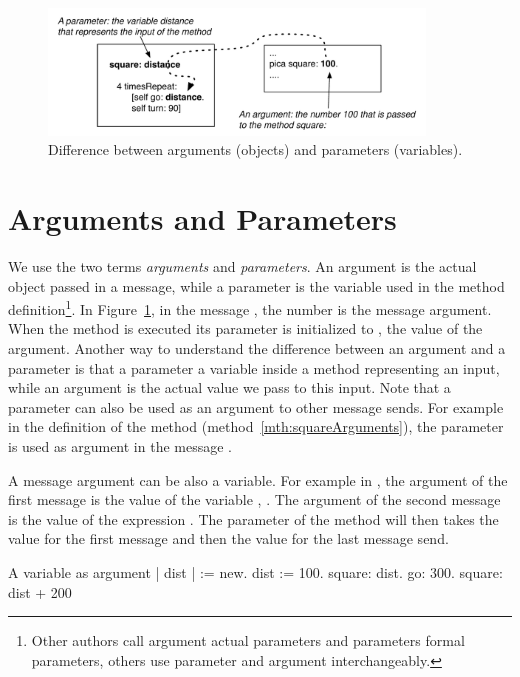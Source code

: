 \begin{figure}[h]
\begin{center}
\includegraphics[width=10cm]{argparam2}
\caption{Difference between arguments (objects) and parameters (variables).\label{fig:argparam}}
\end{center}
\end{figure}

\section{Arguments and Parameters} 
We use the two terms \emph{arguments} and \emph{parameters}.  An argument is the actual object passed in a message, while a parameter is the variable used in the method definition\footnote{Other authors call argument actual parameters and parameters formal parameters, others use parameter and argument interchangeably.}. In Figure~\ref{fig:argparam}, in the message , the number  is the message argument. When the method  is executed its parameter  is initialized to , the value of the argument. Another way to understand the difference between an argument and a parameter is that a parameter a variable inside a method representing an input, while an argument is the actual value we pass to this input. Note that a parameter can also be used as an argument to other message sends. For example in the definition of the method  (method~\ref{mth:squareArguments}), the parameter  is used as argument in the message .



A message argument can be also a variable. For example in , the argument of the first message  is the value of the variable , . The argument of the second message  is the value of the expression  . The parameter  of the method  will then takes the value  for the first message and then the value  for the last message send. 

\begin{scriptwithtitle}{A variable as argument}\label{scr:varasArg}
| \caro dist |
\caro := \Turtle new.
dist := 100. 
\caro square: dist.
\caro go: 300.
\caro square: dist + 200
\end{scriptwithtitle}

